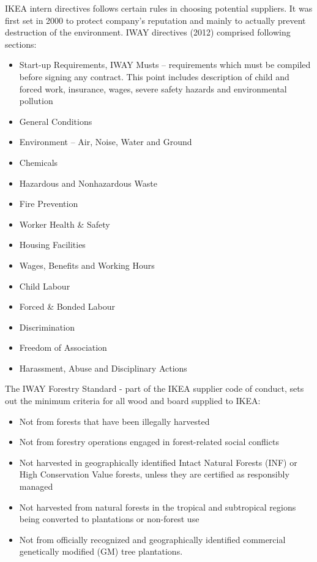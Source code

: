\documentclass[oneside,12pt]{article}%
\begin{document}
IKEA intern directives follows certain rules in choosing potential suppliers. It was first set in 2000 to protect company’s reputation and mainly to actually prevent destruction of the environment. IWAY directives (2012) comprised following sections:
\begin{itemize}
  \item Start-up Requirements, IWAY Musts – requirements which must be compiled before signing any contract. This point includes description of  child and forced work, insurance, wages, severe safety hazards and environmental pollution
  \item General Conditions
  \item Environment – Air, Noise, Water and Ground
  \item Chemicals
  \item Hazardous and Nonhazardous Waste
  \item Fire Prevention
  \item Worker Health & Safety
  \item Housing Facilities
  \item Wages, Benefits and Working Hours
  \item Child Labour
  \item Forced & Bonded Labour
  \item Discrimination
  \item Freedom of Association
  \item Harassment, Abuse and Disciplinary Actions
\end{itemize}


The IWAY Forestry Standard - part of the IKEA supplier code of conduct, sets out the minimum criteria for all wood and board supplied to IKEA:

\begin{itemize}
  \item Not from forests that have been illegally harvested
  \item Not from forestry operations engaged in forest-related social conflicts
  \item Not harvested in geographically identified Intact Natural Forests (INF) or High Conservation Value forests, unless they are certified as responsibly managed
  \item Not harvested from natural forests in the tropical and subtropical regions being converted to plantations or non-forest use
  \item Not from officially recognized and geographically identified commercial genetically modified (GM) tree plantations.
\end{itemize}
\end{document}

